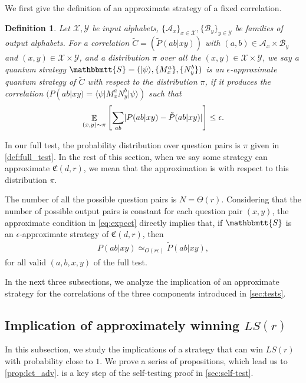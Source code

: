 \documentclass[11pt,letterpaper]{article}
\newcommand{\ket}[1]{|#1\rangle}
\newcommand{\bra}[1]{\langle#1|}
\DeclarePairedDelimiter{\abs}{\lvert}{\rvert}
\DeclareMathOperator*{\E}{\mathbb{E}}
\newcommand{\calX}{\mathcal{X}}
\newcommand{\calY}{\mathcal{Y}}
\newcommand{\calA}{\mathcal{A}}
\newcommand{\calB}{\mathcal{B}}
\newcommand{\1}{\mathbb{1}}
\newcommand{\LS}{LS}
\newcommand{\fC}{\mathfrak{C}}
\newcommand{\bS}{\mathbbmtt{S}}
\newcommand{\pr}[2]{P(#1|#2)}
\newcommand{\tpr}[2]{\tilde{P}(#1|#2)}
\newcommand{\ep}{\epsilon}
\newcommand{\appd}[1]{\simeq_{#1}}
\newtheorem{definition}[theorem]{Definition}
\theoremstyle{definition}
\begin{document}
We first give the definition of an approximate strategy of a fixed correlation.
\begin{definition}
    Let $\calX, \calY$ be input alphabets,
    $\{\calA_x\}_{x \in \calX}, \{\calB_y\}_{y \in \calY}$
    be families of output alphabets.
	For a correlation $\tilde{C} = (\tpr{ab}{xy})$
	with $(a,b) \in \calA_x \times \calB_y$ and $(x,y) \in \calX \times \calY$,
	and a distribution $\pi$ over all the $(x,y) \in \calX \times \calY$,
	we say a quantum strategy $\bS = (\ket{\psi}, \{M_x^a\}, \{N_y^b\})$
	is an $\ep$-approximate quantum strategy of $\tilde{C}$
	with respect to the distribution $\pi$, 
	if it produces the correlation
	$( \pr{ab}{xy} = \bra{\psi} M_x^a N_y^b \ket{\psi} )$ such that
	\begin{align}
	\label{eq:expect}
	\E_{(x,y) \sim \pi} \left[\sum_{ab} \abs{\pr{ab}{xy} - \tpr{ab}{xy}}\right] \leq \ep.
	\end{align}
\end{definition}
In our full test, the probability distribution over question pairs is $\pi$ given in 
\cref{def:full_test}.
In the rest of this section, when we say some strategy can approximate
$\fC(d,r)$, we mean that the approximation is with respect to 
this distribution $\pi$.


The number of all the possible question pairs is 
$N = \Theta(r)$.
Considering that
the number of possible output pairs is constant for each question pair $(x,y)$, 
the approximate condition in \cref{eq:expect} directly implies that, if $\bS$ is an $\ep$-approximate strategy
of $\fC(d,r)$, then
\begin{align*}
    \pr{ab}{xy} \appd{O(r\ep)} \tpr{ab}{xy},
\end{align*}
for all valid $(a,b,x,y)$ of the full test.

In the next three subsections, we analyze the implication of an approximate strategy 
for the correlations of the 
three components introduced in \cref{sec:tests}.

\subsection{Implication of approximately winning $\LS(r)$}
\label{sec:imp_lct}
In this subsection, we study the implications of a strategy that can win $\LS(r)$ with probability close to $1$. We prove a series of 
propositions, which lead us to \cref{prop:lct_adv}.
 is a key step of the self-testing proof in \cref{sec:self-test}.
\end{document}
